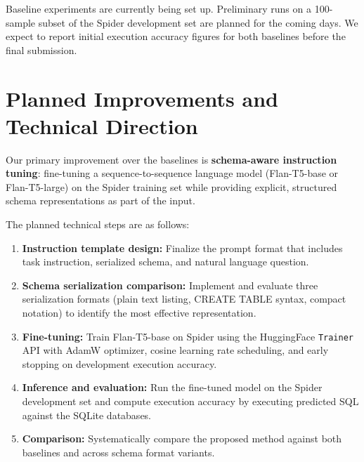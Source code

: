 \documentclass[11pt,a4paper]{article}
\begin{document}
Baseline experiments are currently being set up.
Preliminary runs on a 100-sample subset of the Spider development set are
planned for the coming days.
We expect to report initial execution accuracy figures for both baselines
before the final submission.



\section{Planned Improvements and Technical Direction}


Our primary improvement over the baselines is \textbf{schema-aware instruction
tuning}: fine-tuning a sequence-to-sequence language model (Flan-T5-base or
Flan-T5-large) on the Spider training set while providing explicit, structured
schema representations as part of the input.

The planned technical steps are as follows:

\begin{enumerate}[noitemsep]
  \item \textbf{Instruction template design:} Finalize the prompt format that
        includes task instruction, serialized schema, and natural language question.
  \item \textbf{Schema serialization comparison:} Implement and evaluate three
        serialization formats (plain text listing, CREATE TABLE syntax, compact
        notation) to identify the most effective representation.
  \item \textbf{Fine-tuning:} Train Flan-T5-base on Spider using the HuggingFace
        \texttt{Trainer} API with AdamW optimizer, cosine learning rate scheduling,
        and early stopping on development execution accuracy.
  \item \textbf{Inference and evaluation:} Run the fine-tuned model on the Spider
        development set and compute execution accuracy by executing predicted SQL
        against the SQLite databases.
  \item \textbf{Comparison:} Systematically compare the proposed method against
        both baselines and across schema format variants.
\end{enumerate}
\end{document}
